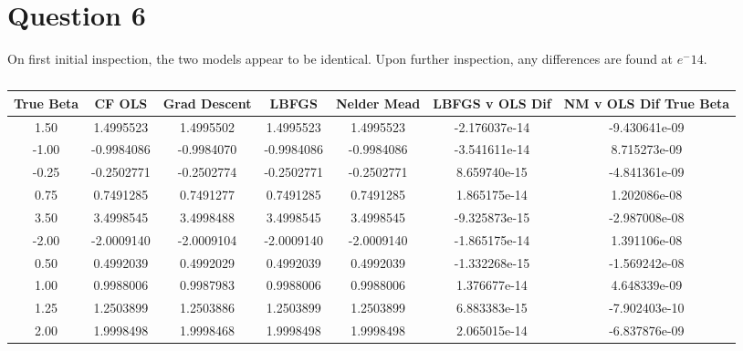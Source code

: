 \documentclass{article}
\begin{document}
\section{Question 6}
 On first initial inspection, the two models appear to be identical.  Upon further inspection, any differences are found at $e^-14$.  
 \begin{table}
    \centering
    \begin{tabular}{c|c|c|c|c|c|c}
   True Beta & CF OLS & Grad Descent & LBFGS & Nelder Mead & LBFGS v OLS Dif & NM v OLS Dif True Beta \\\hline
        1.50 & 1.4995523 & 1.4995502 & 1.4995523 & 1.4995523 & -2.176037e-14 & -9.430641e-09 \\
        -1.00 & -0.9984086 & -0.9984070 & -0.9984086 & -0.9984086 & -3.541611e-14 & 8.715273e-09 \\
        -0.25 & -0.2502771 & -0.2502774 & -0.2502771 & -0.2502771 & 8.659740e-15 & -4.841361e-09 \\
        0.75 & 0.7491285 & 0.7491277 & 0.7491285 & 0.7491285 & 1.865175e-14 & 1.202086e-08 \\
        3.50 & 3.4998545 & 3.4998488 & 3.4998545 & 3.4998545 & -9.325873e-15 & -2.987008e-08 \\
        -2.00 & -2.0009140 & -2.0009104 & -2.0009140 & -2.0009140 & -1.865175e-14 & 1.391106e-08 \\
        0.50 & 0.4992039 & 0.4992029 & 0.4992039 & 0.4992039 & -1.332268e-15 & -1.569242e-08 \\
        1.00 & 0.9988006 & 0.9987983 & 0.9988006 & 0.9988006 & 1.376677e-14 & 4.648339e-09 \\
        1.25 & 1.2503899 & 1.2503886 & 1.2503899 & 1.2503899 & 6.883383e-15 & -7.902403e-10 \\
        2.00 & 1.9998498 & 1.9998468 & 1.9998498 & 1.9998498 & 2.065015e-14 & -6.837876e-09 \\
    \end{tabular}
    \caption{}
    \label{tab:my_label}
\end{table}
 
  
\end{document}

